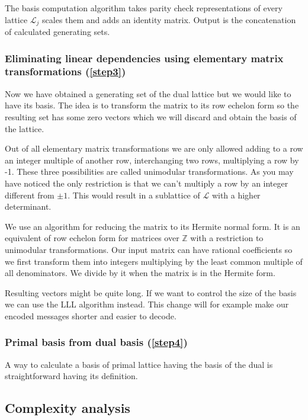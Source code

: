 \documentclass[12pt]{article}
\newcommand{\ZZ}{\mathbb{Z}}
\newcommand{\LL}{\mathcal{L}}
\begin{document}
The basis computation algorithm takes parity check representations of every lattice $\LL_{j}$ scales them and adds an identity matrix. Output is the concatenation of calculated generating sets.

\subsubsection{Eliminating linear dependencies using elementary matrix transformations (\ref{step3})}
\label{subsubsec:hermite_form}
Now we have obtained a generating set of the dual lattice but we would like to have its basis. The idea is to transform the matrix to its row echelon form so the resulting set has some zero vectors which we will discard and obtain the basis of the lattice.

Out of all elementary matrix transformations we are only allowed adding to a row an integer multiple of another row, interchanging two rows, multiplying a row by -1. These three possibilities are called unimodular transformations. As you may have noticed the only restriction is that we can't multiply a row by an integer different from $\pm 1$. This would result in a sublattice of $\LL$ with a higher determinant.

We use an algorithm for reducing the matrix to its Hermite normal form. It is an equivalent of row echelon form for matrices over $\ZZ$ with a restriction to unimodular transformations. Our input matrix can have rational coefficients so we first transform them into integers multiplying by the least common multiple of all denominators. We divide by it when the matrix is in the Hermite form.

Resulting vectors might be quite long. If we want to control the size of the basis we can use the LLL algorithm instead. This change will for example make our encoded messages shorter and easier to decode.

\subsubsection{Primal basis from dual basis (\ref{step4})}
\label{subsubsec:primal_from_dual}
A way to calculate a basis of primal lattice having the basis of the dual is straightforward having its definition.


\subsection{Complexity analysis}
\label{subsec:complexity_integers}
\end{document}
